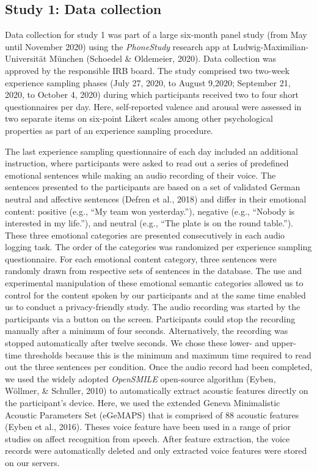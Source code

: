 \documentclass[
  english,
  man,floatsintext]{apa6}
\begin{document}
\hypertarget{study-1-data-collection}{%
\subsection{Study 1: Data collection}\label{study-1-data-collection}}

Data collection for study 1 was part of a large six-month panel study (from May until November 2020) using the \emph{PhoneStudy} research app at Ludwig-Maximilian-Universität München (Schoedel \& Oldemeier, 2020). Data collection was approved by the responsible IRB board. The study comprised two two-week experience sampling phases (July 27, 2020, to August 9,2020; September 21, 2020, to October 4, 2020) during which participants received two to four short questionnaires per day. Here, self-reported valence and arousal were assessed in two separate items on six-point Likert scales among other psychological properties as part of an experience sampling procedure.

The last experience sampling questionnaire of each day included an additional instruction, where participants were asked to read out a series of predefined emotional sentences while making an audio recording of their voice. The sentences presented to the participants are based on a set of validated German neutral and affective sentences (Defren et al., 2018) and differ in their emotional content: positive (e.g., ``My team won yesterday.''), negative (e.g., ``Nobody is interested in my life.''), and neutral (e.g., ``The plate is on the round table.''). These three emotional categories are presented consecutively in each audio logging task. The order of the categories was randomized per experience sampling questionnaire. For each emotional content category, three sentences were randomly drawn from respective sets of sentences in the database. The use and experimental manipulation of these emotional semantic categories allowed us to control for the content spoken by our participants and at the same time enabled us to conduct a privacy-friendly study. The audio recording was started by the participants via a button on the screen. Participants could stop the recording manually after a minimum of four seconds. Alternatively, the recording was stopped automatically after twelve seconds. We chose these lower- and upper-time thresholds because this is the minimum and maximum time required to read out the three sentences per condition.
Once the audio record had been completed, we used the widely adopted \emph{OpenSMILE} open-source algorithm (Eyben, Wöllmer, \& Schuller, 2010) to automatically extract acoustic features directly on the participant's device. Here, we used the extended Geneva Minimalistic Acoustic Parameters Set (eGeMAPS) that is comprised of 88 acoustic features (Eyben et al., 2016). Theses voice feature have been used in a range of prior studies on affect recognition from speech. After feature extraction, the voice records were automatically deleted and only extracted voice features were stored on our servers.
\end{document}
